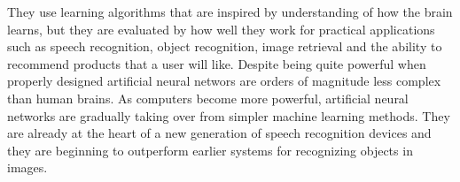 They use learning algorithms that are inspired by understanding of how the brain learns, but they are evaluated by how well they work for practical applications such as speech recognition, object recognition, image retrieval and the ability to recommend products that a user will like.
Despite being quite powerful when properly designed artificial neural networs are orders of magnitude less complex than human brains.
As computers become more powerful, artificial neural networks are gradually taking over from simpler machine learning methods.
They are already at the heart of a new generation of speech recognition devices and they are beginning to outperform earlier systems for recognizing objects in images.

\vspace*{5em}



